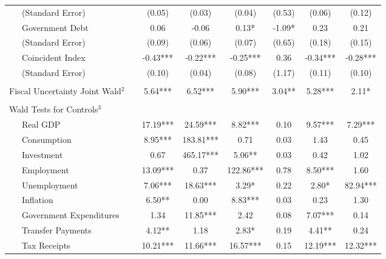\begin{table}
{\begin{center}
\begin{tabular}{l|S[table-format=3.2] S[table-format=3.2] S[table-format=3.2] S[table-format=3.2] S[table-format=3.2] S[table-format=3.2]}
~~~(Standard Error) & (0.05) & (0.03) & (0.04) & (0.53) & (0.06) & (0.12) \\ [0.2pc]
~~~Government Debt & 0.06 & -0.06 & 0.13* & -1.09* & 0.23 & 0.21 \\
~~~(Standard Error) & (0.09) & (0.06) & (0.07) & (0.65) & (0.18) & (0.15) \\ [0.2pc]
~~~Coincident Index & -0.43*** & -0.22*** & -0.25*** & 0.36 & -0.34*** & -0.28*** \\
~~~(Standard Error) & (0.10) & (0.04) & (0.08) & (1.17) & (0.11) & (0.10) \\ [0.2pc]
\hline
 &  \\ [-0.25pc]
Fiscal Uncertainty Joint Wald$^2$~~ & 5.64*** & 6.52*** & 5.90*** & 3.04** & 5.28*** & 2.11* \\ [0.5pc] \hline
 &  \\ [-0.25pc]
Wald Tests for Controls$^3$ &  \\ [0.5pc]
~~~Real GDP & 17.19*** & 24.59*** & 8.82*** & 0.10 & 9.57*** & 7.29*** \\
~~~Consumption & 8.95*** & 183.81*** & 0.71 & 0.03 & 1.43 & 0.45 \\
~~~Investment & 0.67 & 465.17*** & 5.06** & 0.03 & 0.42 & 1.02 \\
~~~Employment & 13.09*** & 0.37 & 122.86*** & 0.78 & 8.50*** & 1.60 \\
~~~Unemployment & 7.06*** & 18.63*** & 3.29* & 0.22 & 2.80* & 82.94*** \\
~~~Inflation & 6.50** & 0.00 & 8.83*** & 0.03 & 0.23 & 1.30 \\
~~~Government Expenditures & 1.34 & 11.85*** & 2.42 & 0.08 & 7.07*** & 0.14 \\
~~~Transfer Payments & 4.12** & 1.18 & 2.83* & 0.19 & 4.41** & 0.24 \\
~~~Tax Receipts & 10.21*** & 11.66*** & 16.57*** & 0.15 & 12.19*** & 12.32*** \\



\end{tabular}
\end{center}}
\end{table}

